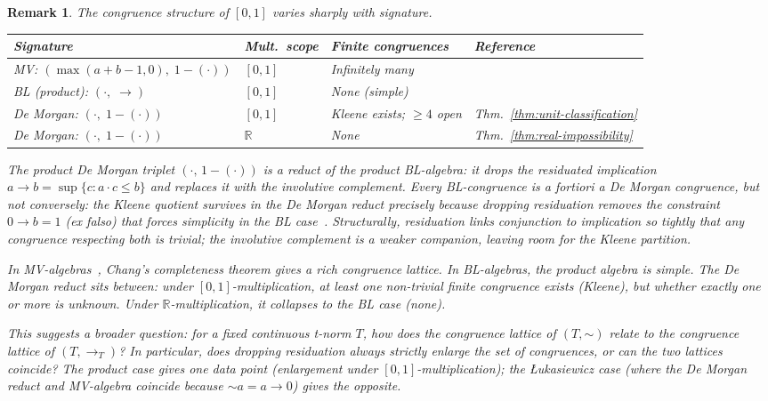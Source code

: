 \documentclass[11pt,a4paper]{article}
\newtheorem{remark}[theorem]{Remark}
\newcommand{\negc}{\mathord{\sim}}
\begin{document}
\begin{remark}
\label{rem:mv-comparison}
The congruence structure of $[0,1]$ varies sharply with signature.

\smallskip
\begin{center}
\small
\begin{tabular}{llll}
\toprule
\textbf{Signature} & \textbf{Mult.\ scope}
  & \textbf{Finite congruences} & \textbf{Reference} \\
\midrule
MV: $(\max(a{+}b{-}1,0),\; 1{-}(\cdot))$
  & $[0,1]$ & Infinitely many
  & \cite{cignoli2000,mundici2011} \\
BL (product): $({\cdot},\; {\to})$
  & $[0,1]$ & None (simple)
  & \cite[Cor.~3.7]{agliano2003} \\
De Morgan: $({\cdot},\; 1{-}(\cdot))$
  & $[0,1]$ & Kleene exists; $\geq\!4$ open
  & Thm.~\ref{thm:unit-classification} \\
De Morgan: $({\cdot},\; 1{-}(\cdot))$
  & $\mathbb{R}$ & None
  & Thm.~\ref{thm:real-impossibility} \\
\bottomrule
\end{tabular}
\normalsize
\end{center}
\smallskip

The product De Morgan triplet $({\cdot},\, 1{-}(\cdot))$ is a
\emph{reduct} of the product BL-algebra: it drops the residuated
implication $a \to b = \sup\{c : a \cdot c \leq b\}$ and replaces it
with the involutive complement.
Every BL-congruence is a fortiori a De Morgan congruence, but not
conversely: the Kleene quotient survives in the De Morgan reduct
precisely because dropping residuation removes the constraint
$0 \to b = 1$ (ex falso) that forces simplicity in the BL
case~\cite[Cor.~3.7]{agliano2003}\cite{galatos2007}.
Structurally, residuation links conjunction to implication so tightly
that any congruence respecting both is trivial; the involutive
complement is a weaker companion, leaving room for the Kleene
partition.

In MV-algebras~\cite{cignoli2000,mundici2011}, Chang's completeness
theorem gives a rich congruence lattice.
In BL-algebras, the product algebra is simple.
The De Morgan reduct sits between: under $[0,1]$-multiplication, at
least one non-trivial finite congruence exists (Kleene), but whether
exactly one or more is unknown.
Under $\mathbb{R}$-multiplication, it collapses to the BL case (none).

This suggests a broader question: for a fixed continuous t-norm $T$,
how does the congruence lattice of $(T, \negc)$ relate to the
congruence lattice of $(T, \to_T)$?
In particular, does dropping residuation always \emph{strictly enlarge}
the set of congruences, or can the two lattices coincide?
The product case gives one data point (enlargement under $[0,1]$-multiplication);
the \L ukasiewicz case (where the De Morgan reduct and MV-algebra
coincide because $\negc a = a \to 0$) gives the opposite.
\end{remark}
\end{document}

